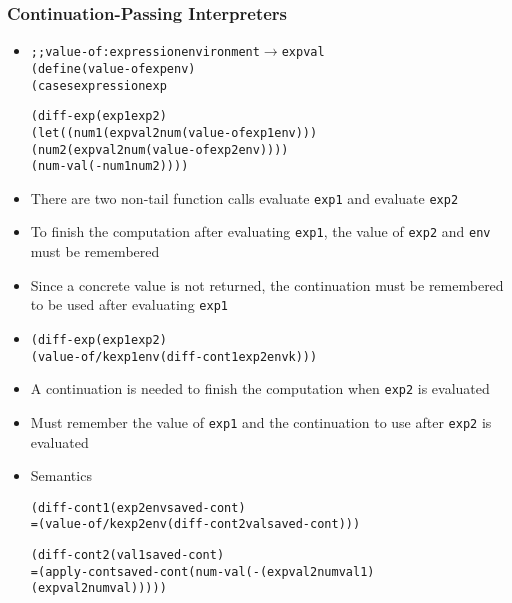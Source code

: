 \documentclass{beamer}
\newcommand{\arrow}{\(\rightarrow\)}
\begin{document}
\begin{frame}[fragile]
\frametitle{Continuation-Passing Interpreters}
\begin{scriptsize}
\begin{itemize}
\item<1->
\begin{alltt}
;; value-of : expression environment \arrow{} expval
(define (value-of exp env)
  (cases expression exp

    (diff-exp (exp1 exp2)
              (let ((num1 (expval2num (value-of exp1 env)))
                    (num2 (expval2num (value-of exp2 env))))
                (num-val (- num1 num2))))
\end{alltt}

\item<1-> There are two non-tail function calls evaluate \texttt{exp1} and evaluate \texttt{exp2}

\item<1-> To finish the computation after evaluating \texttt{exp1}, the value of \texttt{exp2} and \texttt{env} must be remembered

\item<1-> Since a concrete value is not returned, the continuation must be remembered to be used after evaluating \texttt{exp1}

\item<2->
\begin{alltt}
    (diff-exp (exp1 exp2)
              (value-of/k exp1 env (diff-cont1 exp2 env k)))
\end{alltt}

\item<2-> A continuation is needed to finish the computation when \texttt{exp2} is evaluated

\item<2-> Must remember the value of \texttt{exp1} and the continuation to use after \texttt{exp2} is evaluated

\item<3-> Semantics
\begin{alltt}
  (diff-cont1 (exp2 env saved-cont)
= (value-of/k exp2 env (diff-cont2 val saved-cont)))

  (diff-cont2 (val1 saved-cont)
= (apply-cont saved-cont (num-val (- (expval2num val1)
                                     (expval2num val)))))
\end{alltt}

\end{itemize}
\end{scriptsize}
\end{frame}
\end{document}
